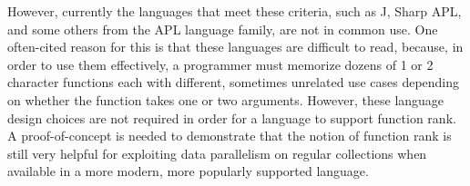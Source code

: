 However, currently the languages that meet these criteria, 
such as J, Sharp APL, and some others from the APL language family, 
are not in common use. %
One often-cited reason for this is that these languages are difficult to read, %
because, in order to use them effectively, a programmer must memorize 
dozens of 1 or 2 character functions each with different, sometimes unrelated use cases 
depending on whether the function takes one or two arguments.\cite{jvocab} %
However, these language design choices are not required in order for a language to support function rank.
A proof-of-concept is needed %
to demonstrate that the notion of function rank %
is still very helpful for exploiting data parallelism on regular collections 
when available in a more modern, more popularly supported language.

